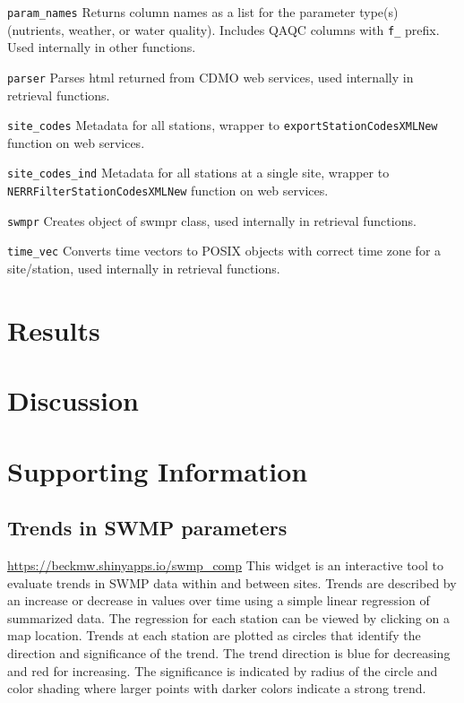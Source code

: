 \documentclass[10pt,letterpaper]{article}\usepackage[]{graphicx}\usepackage[]{color}
\begin{document}
\texttt{param\_names} Returns column names as a list for the parameter type(s) (nutrients, weather, or water quality).  Includes QAQC columns with \texttt{f\_} prefix. Used internally in other functions.

\texttt{parser} Parses html returned from \ac{CDMO} web services, used internally in retrieval functions.

\texttt{site\_codes} Metadata for all stations, wrapper to \texttt{exportStationCodesXMLNew} function on web services.

\texttt{site\_codes\_ind} Metadata for all stations at a single site, wrapper  to \texttt{NERRFilterStationCodesXMLNew} function on web services.

\texttt{swmpr} Creates object of swmpr class, used internally in retrieval functions.

\texttt{time\_vec} Converts time vectors to POSIX objects with correct time zone for a site/station, used internally in retrieval functions.



\section*{Results}

\section*{Discussion}

\section*{Supporting Information}
\label{supp_info}

\subsection*{Trends in SWMP parameters}
\label{swmp_trends}
\href{https://beckmw.shinyapps.io/swmp_comp}{https://beckmw.shinyapps.io/swmp\_comp}
\bigskip
This widget is an interactive tool to evaluate trends in SWMP data within and between sites.  Trends are described by an increase or decrease in values over time using a simple linear regression of summarized data.  The regression for each station can be viewed by clicking on a map location.  Trends at each station are plotted as circles that identify the direction and significance of the trend.  The trend direction is blue for decreasing and red for increasing.  The significance is indicated by radius of the circle and color shading where larger points with darker colors indicate a strong trend.
\end{document}
